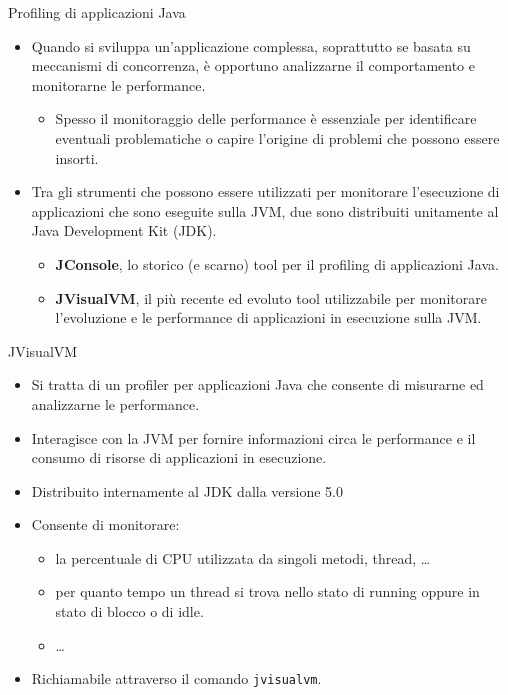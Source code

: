 \documentclass[presentation]{beamer}
\begin{document}
\begin{frame}{Profiling di applicazioni Java}
\begin{itemize}\itemsep10pt
\item Quando si sviluppa un'applicazione complessa, soprattutto se basata su meccanismi di concorrenza, è opportuno analizzarne il comportamento e monitorarne le performance.
\begin{itemize}
\item Spesso il monitoraggio delle performance è essenziale per identificare eventuali problematiche o capire l'origine di problemi che possono essere insorti.
\end{itemize}
\item Tra gli strumenti che possono essere utilizzati per monitorare l'esecuzione di applicazioni che sono eseguite sulla JVM, due sono distribuiti unitamente al Java Development Kit (JDK).
\begin{itemize}
\item \textbf{JConsole}, lo storico (e scarno) tool per il profiling di applicazioni Java.
\item \textbf{JVisualVM}, il più recente ed evoluto tool utilizzabile per monitorare l'evoluzione e le performance di applicazioni in esecuzione sulla JVM.
\end{itemize}
\end{itemize}
\end{frame}

\begin{frame}{JVisualVM}
\begin{itemize}\itemsep10pt
\item Si tratta di un profiler per applicazioni Java che consente di misurarne ed analizzarne le performance.
\item Interagisce con la JVM per fornire informazioni circa le performance e il consumo di risorse di applicazioni in esecuzione.
\item Distribuito internamente al JDK dalla versione 5.0
\item Consente di monitorare:
\begin{itemize}
\item la percentuale di CPU utilizzata da singoli metodi, thread, \dots
\item per quanto tempo un thread si trova nello stato di running oppure in stato di blocco o di idle.
\item \dots
\end{itemize}
\item Richiamabile attraverso il comando \texttt{jvisualvm}.
\end{itemize}
\end{frame}
\end{document}
